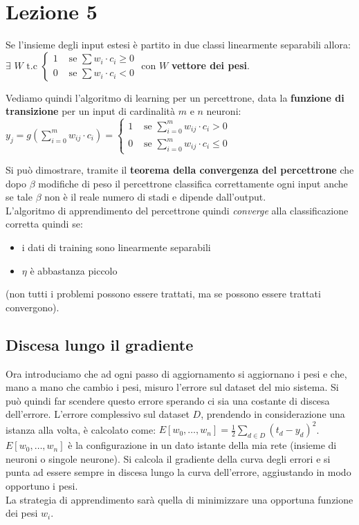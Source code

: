 \section{Lezione 5}

Se l'insieme degli input estesi è partito in due classi linearmente separabili allora: $\exists\,\,W\mbox{ t.c } \begin{cases} 1 &\mbox{ se } \sum w_i\cdot c_i \geq 0\\ 0 &\mbox{ se } \sum w_i\cdot c_i < 0 \end{cases}$ con $W$ \textbf{vettore dei pesi}. 

Vediamo quindi l'algoritmo di learning per un percettrone, data la \textbf{funzione di transizione} per un input di cardinalità $m$ e $n$ neuroni: $\displaystyle y_j=g\left(\sum_{i=0}^m w_{ij}\cdot c_i \right)= \begin{cases} 1 &\mbox{ se } \sum_{i=0}^m w_{ij}\cdot c_i > 0\\ 0 &\mbox{ se } \sum_{i=0}^m w_{ij}\cdot c_i \leq 0 \end{cases} $

Si può dimostrare, tramite il \textbf{teorema della convergenza del percettrone} che dopo $\beta$ modifiche di peso il percettrone classifica correttamente ogni input anche se tale $\beta$ non è il reale numero di stadi e dipende dall'output.\\ L'algoritmo di apprendimento del percettrone quindi \textit{converge} alla classificazione corretta quindi se: 
\begin{itemize} 
    \item i dati di training sono linearmente separabili 
    \item $\eta$ è abbastanza piccolo 
\end{itemize}(non tutti i problemi possono essere trattati, ma se possono essere trattati convergono).

\subsection{Discesa lungo il gradiente}
Ora introduciamo che ad ogni passo di aggiornamento si aggiornano i pesi e che, mano a mano che cambio i pesi, misuro l'errore sul dataset del mio sistema. Si può quindi far scendere questo errore sperando ci sia una costante di discesa dell'errore. 
L'errore complessivo sul dataset $D$, prendendo in considerazione una istanza alla volta, è calcolato come:
$E[w_0,\ldots, w_n]=\displaystyle \frac{1}{2}\sum_{d\in D}(t_d-y_d)^2$.
$E[w_0,\ldots, w_n]$ è la configurazione in un dato istante della mia rete (insieme di neuroni o singole neurone).
Si calcola il gradiente della curva degli errori e si punta ad essere sempre in discesa lungo la curva dell'errore, aggiustando in modo opportuno i pesi.\\ La strategia di apprendimento sarà quella di minimizzare una opportuna funzione dei pesi $w_i$. \\

